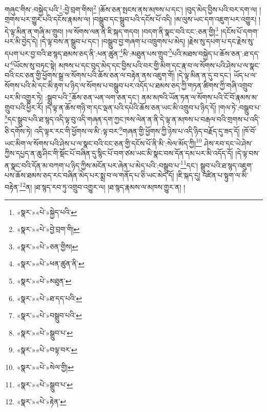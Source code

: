 གཞུང་གིས་:བསྐྱེད་པའི་\footnote{«སྣར་»«པེ་»སྐྱེད་པའི་}:བྱེ་བྲག་གིས།\footnote{«སྣར་»«པེ་»བྱེ་བྲག་གི།} །ཆོས་ཅན་སྤངས་ནས་མཁས་པ་དང་། །བུད་མེད་བྱིས་པའི་བར་དག་ལ། །གྲགས་པར་གྱུར་པའི་དངོས་རྣམས་ལ། །བསྒྲུབ་དང་སྒྲུབ་པའི་དངོས་པོ་འདི། །མ་ལུས་ཡང་དག་འཇུག་པར་འགྱུར། །དེ་ལྟ་མིན་ན་གཞི་མ་གྲུབ། །ལ་སོགས་ལན་ནི་ཇི་སྐད་གདབ། །བདག་ནི་སྣང་བའི་ངང་:ཅན་གྱི།\footnote{«སྣར་»«པེ་»ཅན་གྱིས།} །དངོས་པོ་དགག་པར་མི་བྱེད་དེ། །དེ་ལྟ་བས་ན་སྒྲུབ་པ་དང་། །བསྒྲུབ་བྱ་གཞག་པ་འཁྲུགས་པ་མེད། །རྗེས་སུ་དཔག་པ་དང་རྗེས་སུ་དཔག་པར་བྱ་བའི་ཐ་སྙད་ཐམས་ཅད་ནི་:ཕན་ཚུན་\footnote{«སྣར་»«པེ་»ཕན་ཚུན་ནི་}མི་:མཐུན་པས་གྲུབ་\footnote{«སྣར་»«པེ་»མཐུན་}པའི་མཐས་བསྐྱེད་པ་ཆོས་ཅན་:ཐ་དད་པ་\footnote{«སྣར་»«པེ་»ཐ་དད་པའི་}ཡོངས་སུ་བཏང་སྟེ། མཁས་པ་དང་བུད་མེད་དང་བྱིས་པའི་བར་གྱི་མིག་དང་རྣ་བ་ལ་སོགས་པའི་ཤེས་པ་ལ་སྣང་བའི་ངང་ཅན་གྱི་ཕྱོགས་སྒྲ་ལ་སོགས་པའི་ཆོས་ཅན་ལ་བརྟེན་ནས་འཇུག་གོ། །དེ་ལྟ་མིན་ན་དུ་བ་དང་། ཡོད་པ་ལ་སོགས་པའི་མེ་དང་མི་རྟག་པ་ཉིད་ལ་སོགས་པ་བསྒྲུབ་པར་འདོད་པ་ཐམས་ཅད་ཀྱི་གཏན་ཚིགས་ཀྱི་གཞི་འགྲུབ་པར་མི་འགྱུར་ཏེ། :སྒྲུབ་པའི་\footnote{«སྣར་»«པེ་»བསྒྲུབ་པའི་}ཆོས་ཅན་ཡན་ལག་ཅན་དང་། ནམ་མཁའི་ཡོན་ཏན་ལ་སོགས་པའི་ངོ་བོ་རྣམས་མ་གྲུབ་པའི་ཕྱིར་རོ། །དེ་ལྟ་ན་ཆོས་གཉི་ག་དང་ལྡན་པའི་དཔེའི་ཆོས་ཅན་ཡང་མི་འགྲུབ་པ་ཉིད་དོ། །གལ་ཏེ་:བསྒྲུབ་པ་\footnote{«སྣར་»«པེ་»སྒྲུབ་པ་}དང་སྒྲུབ་པའི་ཐ་སྙད་འདི་ལྟ་བུ་འདི་གཞན་དག་ཀྱང་ཁས་ལེན་ན་ནི་དེ་ལྟ་ན་མཁས་པ་བརྒལ་བའི་གྲགས་པ་འདི་ཅི་དགོས་ཏེ། འདི་ལྟར་རང་གི་ཕྱོགས་ལ་མི་:ལྟ་བར་\footnote{«སྣར་»«པེ་»བལྟ་བར་}གཞན་གྱི་ཕྱོགས་ཀྱི་ཉེས་པ་འདི་ཉིད་བརྗོད་དུ་ཟད་དོ། །ཁོ་བོ་ཡང་མིག་ལ་སོགས་པའི་ཤེས་པ་ལ་སྣང་བའི་ངང་ཅན་གྱི་དངོས་པོ་ནི་མི་:སེལ་མོད་ཀྱི།\footnote{«སྣར་»«པེ་»སེལ་གྱི།} ཤེས་རབ་དང་ཡེ་ཤེས་ཀྱིས་དཔྱད་ན་ཆུ་ཤིང་གི་སྡོང་པོ་བཞིན་དུ་སྙིང་པོ་བག་ཙམ་ཡང་མི་སྣང་བས་དོན་དམ་པར་མི་འདོད་དོ། །དེ་ལྟ་བས་ན་སྣང་བའི་དོན་མ་བཀག་པ་ཉིད་ཀྱིས་མངོན་པར་ཞེན་པ་མེད་པའི་:བསྒྲུབ་པ་\footnote{«སྣར་»«པེ་»སྒྲུབ་པ་}དང་། སྒྲུབ་པའི་ཐ་སྙད་འཇུག་པས་ཆོས་ཐམས་ཅད་རང་བཞིན་མེད་པར་སྨྲ་བ་ལ་གནོད་པ་ཅི་ཡང་མེད་དོ། །ཇི་སྐད་དུ། འཛིན་པ་སྟུག་ལ་མི་བརྟེན་\footnote{«སྣར་»«པེ་»རྟེན་}ན། །ཐ་སྙད་རབ་ཏུ་འགྲུབ་འགྱུར་ལ། །ཐ་སྙད་རྣམས་ལ་མཁས་གྱུར་ན། །
